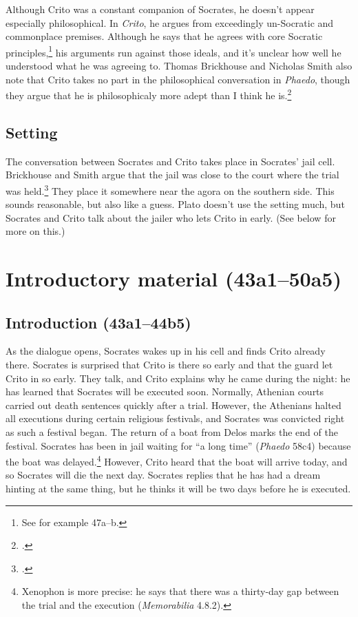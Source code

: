 \documentclass[12pt,letterpaper]{article}
\begin{document}
Although Crito was a constant companion of Socrates, he doesn't appear especially philosophical. In \textit{Crito}, he argues from exceedingly un-Socratic and commonplace premises. Although he says that he agrees with core Socratic principles,\footnote{See for example 47a--b.} his arguments run against those ideals, and it's unclear how well he understood what he was agreeing to. Thomas Brickhouse and Nicholas Smith also note that Crito takes no part in the philosophical conversation in \textit{Phaedo}, though they argue that he is philosophicaly more adept than I think he is.\footcite[][196]{brickhouse-smith2004-plato-trial-of-socrates}

\subsection*{Setting}

The conversation between Socrates and Crito takes place in Socrates' jail cell. Brickhouse and Smith argue that the jail was close to the court where the trial was held.\footcite[][197]{brickhouse-smith2004-plato-trial-of-socrates} They place it somewhere near the agora on the southern side. This sounds reasonable, but also like a guess. Plato doesn't use the setting much, but Socrates and Crito talk about the jailer who lets Crito in early. (See below for more on this.)


\section*{Introductory material (43a1--50a5)}

\subsection*{Introduction (43a1--44b5)}

As the dialogue opens, Socrates wakes up in his cell and finds Crito already there. Socrates is surprised that Crito is there so early and that the guard let Crito in so early. They talk, and Crito explains why he came during the night: he has learned that Socrates will be executed soon. Normally, Athenian courts carried out death sentences quickly after a trial. However, the Athenians halted all executions during certain religious festivals, and Socrates was convicted right as such a festival began. The return of a boat from Delos marks the end of the festival. Socrates has been in jail waiting for ``a long time'' (\textit{Phaedo} 58c4) because the boat was delayed.\footnote{Xenophon is more precise: he says that there was a thirty-day gap between the trial and the execution (\textit{Memorabilia} 4.8.2).} However, Crito heard that the boat will arrive today, and so Socrates will die the next day. Socrates replies that he has had a dream hinting at the same thing, but he thinks it will be two days before he is executed.
\end{document}

